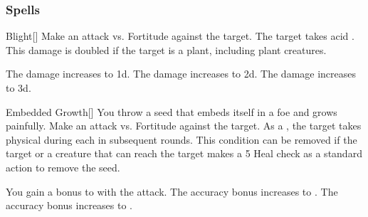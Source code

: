 \subsubsection{Spells}


\lowercase{\hypertarget{spell:Blight}{}}\label{spell:Blight}
\begin{freeability}[Rank 1]{\hypertarget{spell:Blight}{Blight}}[]
Make an attack vs. Fortitude against the target.
\hit The target takes acid .
This damage is doubled if the target is a plant, including plant creatures.

\rankline
{} The damage increases to  \plus1d.
 The damage increases to  \plus2d.
 The damage increases to  \plus3d.
\end{freeability}
\vspace{0.25em}



\lowercase{\hypertarget{spell:Embedded Growth}{}}\label{spell:Embedded Growth}
\begin{freeability}[Rank 1]{\hypertarget{spell:Embedded Growth}{Embedded Growth}}[]
You throw a seed that embeds itself in a foe and grows painfully.
Make an attack vs. Fortitude against the target.
\hit As a , the target takes physical  during each  in subsequent rounds.
This condition can be removed if the target or a creature that can reach the target makes a  5 Heal check as a standard action to remove the seed.

\rankline
{} You gain a  bonus to  with the attack.
 The accuracy bonus increases to .
 The accuracy bonus increases to .
\end{freeability}
\vspace{0.25em}



